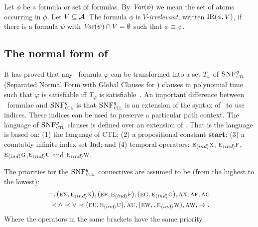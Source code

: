 \documentclass{article}
\begin{document}
Let $\phi$ be a formula or set of formulas. By $\textit{Var}(\phi)$ we mean the set of atoms occurring in $\phi$.
Let $V\subseteq\cal A$.
The formula $\phi$ is $V$-{\em irrelevant}, written $\textrm{IR}(\phi,V)$,
if there is a formula $\psi$ with
$\textit{Var}(\psi)\cap V=\emptyset$ such that $\phi\equiv\psi$.


\subsection{The normal form of \CTL}
It has proved that any \CTL\ formula $\varphi$ can be transformed into a set $T_\varphi$ of ${\textsc{SNF}_{\textsc{ctl}}^g}$ (Separated Normal Form with Global Clauses for \CTL) clauses in polynomial time such that $\varphi$ is satisfiable iff $T_\varphi$ is satisfiable~\cite{zhang2008first}.
An important difference between \CTL\ formulae and ${\textsc{SNF}_{\textsc{ctl}}^g}$ is that ${\textsc{SNF}_{\textsc{ctl}}^g}$ is an extension of the syntax of \CTL\ to use indices. These indices can be used to preserve a particular path context. The language of ${\textsc{SNF}_{\textsc{ctl}}^g}$ clauses is defined over an extension of \CTL. That is the language is based on: (1) the language of CTL; (2) a propositional constant $\textbf{start}$; (3) a countably infinite index set $\textrm{Ind}$; and (4) temporal operators: $\textsc{e}_{{\langle{ind}\rangle}} \textsc{x}$, $\textsc{e}_{{\langle{ind}\rangle}} \textsc{f}$, $\textsc{e}_{{\langle{ind}\rangle}} \textsc{g}$,$\textsc{e}_{{\langle{ind}\rangle}} \textsc{u}$ and $\textsc{e}_{{\langle{ind}\rangle}} \textsc{w}$.

The priorities for the ${\textsc{SNF}_{\textsc{ctl}}^g}$\ connectives are assumed to be (from the highest to the lowest):
\begin{align*}
  &\neg, (\textsc{e}\textsc{x},\textsc{e}_{{\langle{ind}\rangle}}\textsc{x}), (\textsc{e}\textsc{f} ,\textsc{e}_{{\langle{ind}\rangle}}\textsc{f}), (\textsc{e}\textsc{g},\textsc{e}_{{\langle{ind}\rangle}} \textsc{g}), \textsc{a}\textsc{x}, \textsc{a}\textsc{f}, \textsc{a}\textsc{g} \\
  &\prec \land \prec \lor \prec (\textsc{e}\textsc{u},\textsc{e}_{{\langle{ind}\rangle}} \textsc{u}), \textsc{a}\textsc{u}, (\textsc{e} \textsc{w}, ,\textsc{e}_{{\langle{ind}\rangle}}\textsc{w}), \textsc{a} \textsc{w}, \rightarrow.
\end{align*}
Where the operators in the same brackets have the same priority.
\end{document}
